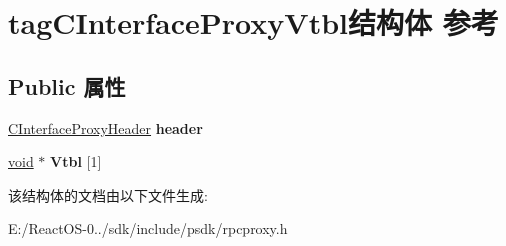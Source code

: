 \hypertarget{structtag_c_interface_proxy_vtbl}{}\section{tag\+C\+Interface\+Proxy\+Vtbl结构体 参考}
\label{structtag_c_interface_proxy_vtbl}
\subsection*{Public 属性}
\begin{DoxyCompactItemize}
\item 
\mbox{\label{structtag_c_interface_proxy_vtbl_a4479e434aab6e5393ea839378638f9dd}} 
\hyperlink{structtag_c_interface_proxy_header}{C\+Interface\+Proxy\+Header} {\bfseries header}
\item 
\mbox{\label{structtag_c_interface_proxy_vtbl_af6695c4ef16ef27388a7298aee246c2b}} 
\hyperlink{interfacevoid}{void} $\ast$ {\bfseries Vtbl} \mbox{[}1\mbox{]}
\end{DoxyCompactItemize}


该结构体的文档由以下文件生成\+:\begin{DoxyCompactItemize}
\item 
E\+:/\+React\+O\+S-\/0../sdk/include/psdk/rpcproxy.\+h\end{DoxyCompactItemize}
